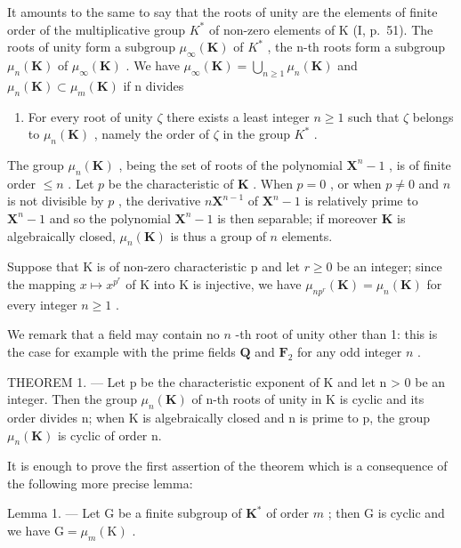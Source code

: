 It amounts to the same to say that the roots of unity are the elements of finite order of the multiplicative group \(K^{*}\) of non-zero elements of K (I, p.~51). The roots of unity form a subgroup \(\mu_{\infty}(\mathbf{K})\) of \(K^{*}\) , the n-th roots form a subgroup \(\mu_{n}(\mathbf{K})\) of \(\mu_{\infty}(\mathbf{K})\) . We have \(\mu_{\infty}(\mathbf{K}) = \bigcup_{n \geqslant 1} \mu_{n}(\mathbf{K})\) and \(\mu_{n}(\mathbf{K}) \subset \mu_{m}(\mathbf{K})\) if n divides

\begin{enumerate}
\def\labelenumi{\alph{enumi}.}
\setcounter{enumi}{12}
\tightlist
\item
  For every root of unity \(\zeta\) there exists a least integer \(n \geqslant 1\) such that \(\zeta\) belongs to \(\mu_{n}(\mathbf{K})\) , namely the order of \(\zeta\) in the group \(K^{*}\) .
\end{enumerate}

The group \(\mu_n(\mathbf{K})\) , being the set of roots of the polynomial \(\mathbf{X}^n - 1\) , is of finite order \(\leqslant n\) . Let \(p\) be the characteristic of \(\mathbf{K}\) . When \(p = 0\) , or when \(p \neq 0\) and \(n\) is not divisible by \(p\) , the derivative \(n\mathbf{X}^{n-1}\) of \(\mathbf{X}^n - 1\) is relatively prime to \(\mathbf{X}^n - 1\) and so the polynomial \(\mathbf{X}^n - 1\) is then separable; if moreover \(\mathbf{K}\) is algebraically closed, \(\mu_n(\mathbf{K})\) is thus a group of \(n\) elements.

Suppose that K is of non-zero characteristic p and let \(r \geqslant 0\) be an integer; since the mapping \(x \mapsto x^{p^{r}}\) of K into K is injective, we have \(\mu_{np^{r}}(\mathbf{K}) = \mu_n(\mathbf{K})\) for every integer \(n \geqslant 1\) .

We remark that a field may contain no \(n\) -th root of unity other than 1: this is the case for example with the prime fields \(\mathbf{Q}\) and \(\mathbf{F}_2\) for any odd integer \(n\) .

THEOREM 1. --- Let p be the characteristic exponent of K and let n \textgreater{} 0 be an integer. Then the group \(\mu_{n}(\mathbf{K})\) of n-th roots of unity in K is cyclic and its order divides n; when K is algebraically closed and n is prime to p, the group \(\mu_{n}(\mathbf{K})\) is cyclic of order n.

It is enough to prove the first assertion of the theorem which is a consequence of the following more precise lemma:

Lemma 1. --- Let G be a finite subgroup of \(\mathbf{K}^*\) of order \(m\) ; then G is cyclic and we have \(\mathrm{G} = \mu_m(\mathrm{K})\) .


